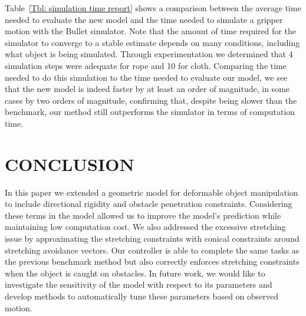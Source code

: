Table~\ref{Tbl: simulation time report} shows a comparison between the average time needed to evaluate the new model and the time needed to simulate a gripper motion with the Bullet simulator. Note that the amount of time required for the simulator to converge to a stable estimate depends on many conditions, including what object is being simulated. Through experimentation we determined that 4 simulation steps were adequate for rope and 10 for cloth. Comparing the time needed to do this simulation to the time needed to evaluate our model, we see that the new model is indeed faster by at least an order of magnitude, in some cases by two orders of magnitude, confirming that, despite being slower than the benchmark, our method still outperforms the simulator in terms of computation time.






























\section{CONCLUSION}

In this paper we extended a geometric model for deformable object manipulation to include directional rigidity and obstacle penetration constraints. Considering these terms in the model allowed us to improve the model's prediction while maintaining low computation cost. We also addressed the excessive stretching issue by approximating the stretching constraints with conical constraints around stretching avoidance vectors. Our controller is able to complete the same tasks as the previous benchmark method but also correctly enforces stretching constraints when the object is caught on obstacles. In future work, we would like to investigate the sensitivity of the model with respect to its parameters and develop methods to automatically tune these parameters based on observed motion.